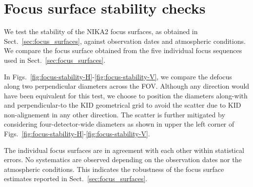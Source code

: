 
\section{Focus surface stability checks}
\label{ap:focus_surfaces}

We test the stability of the NIKA2 focus surfaces, as obtained in
Sect.~\ref{sec:focus_surfaces}, against observation dates and
atmospheric conditions. We compare the focus surface obtained from the
five individual focus sequences used in Sect.~\ref{sec:focus_surfaces}.

In Figs.~\ref{fig:focus-stability-H}-\ref{fig:focus-stability-V}, we compare
the defocus along two perpendicular diameters across the
FOV. Although any direction would have been equivalent for this test, we choose to
position the diameters along-with and perpendicular-to the KID geometrical
grid to avoid the scatter due to KID non-alignement in any other
direction. The scatter is further mitigated by considering
four-detector-wide diameters as shown in upper the left corner of
Figs.~\ref{fig:focus-stability-H}-\ref{fig:focus-stability-V}.

The individual focus surfaces are in agreement with each other within
statistical errors. No systematics are observed depending on the
observation dates nor the atmospheric conditions. This indicates the
robustness of the focus surface estimates reported in
Sect.~\ref{sec:focus_surfaces}.




